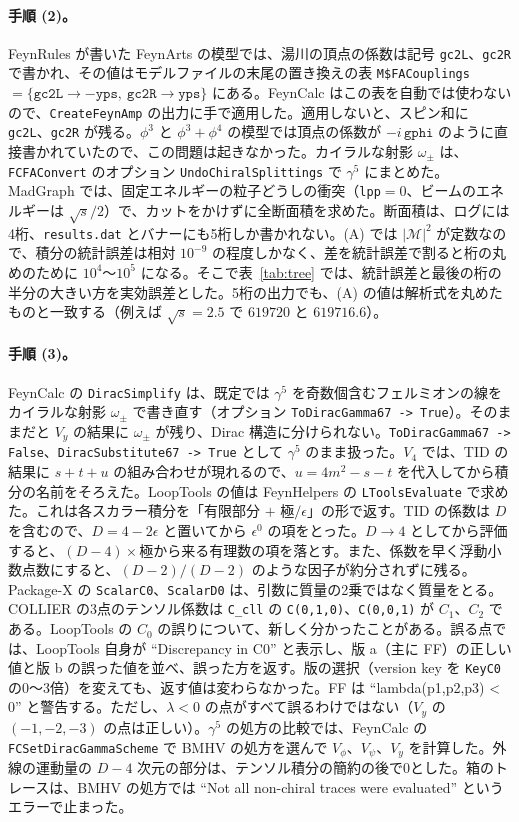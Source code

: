 \documentclass[a4paper,10pt]{ltjsarticle}
\begin{document}
\paragraph{手順 (2)。}FeynRules が書いた FeynArts の模型では、湯川の頂点の係数は記号 \texttt{gc2L}、\texttt{gc2R} で書かれ、その値はモデルファイルの末尾の置き換えの表 \texttt{M\$FACouplings} $=\{\texttt{gc2L}\to-\texttt{yps},\ \texttt{gc2R}\to\texttt{yps}\}$ にある。FeynCalc はこの表を自動では使わないので、\texttt{CreateFeynAmp} の出力に手で適用した。適用しないと、スピン和に \texttt{gc2L}、\texttt{gc2R} が残る。$\phi^3$ と $\phi^3+\phi^4$ の模型では頂点の係数が $-i\,\texttt{gphi}$ のように直接書かれていたので、この問題は起きなかった。カイラルな射影 $\omega_\pm$ は、\texttt{FCFAConvert} のオプション \texttt{UndoChiralSplittings} で $\gamma^5$ にまとめた。MadGraph では、固定エネルギーの粒子どうしの衝突（\texttt{lpp}$=0$、ビームのエネルギーは $\sqrt s/2$）で、カットをかけずに全断面積を求めた。断面積は、ログには4桁、\texttt{results.dat} とバナーにも5桁しか書かれない。(A) では $|\mathcal M|^2$ が定数なので、積分の統計誤差は相対 $10^{-9}$ の程度しかなく、差を統計誤差で割ると桁の丸めのために $10^4$〜$10^5$ になる。そこで表~\ref{tab:tree} では、統計誤差と最後の桁の半分の大きい方を実効誤差とした。5桁の出力でも、(A) の値は解析式を丸めたものと一致する（例えば $\sqrt s=2.5$ で $619720$ と $619716.6$）。

\paragraph{手順 (3)。}FeynCalc の \texttt{DiracSimplify} は、既定では $\gamma^5$ を奇数個含むフェルミオンの線をカイラルな射影 $\omega_\pm$ で書き直す（オプション \texttt{ToDiracGamma67 -> True}）。そのままだと $V_y$ の結果に $\omega_\pm$ が残り、Dirac 構造に分けられない。\texttt{ToDiracGamma67 -> False}、\texttt{DiracSubstitute67 -> True} として $\gamma^5$ のまま扱った。$V_4$ では、TID の結果に $s+t+u$ の組み合わせが現れるので、$u=4m^2-s-t$ を代入してから積分の名前をそろえた。LoopTools の値は FeynHelpers の \texttt{LToolsEvaluate} で求めた。これは各スカラー積分を「有限部分 $+$ 極$/\epsilon$」の形で返す。TID の係数は $D$ を含むので、$D=4-2\epsilon$ と置いてから $\epsilon^0$ の項をとった。$D\to4$ としてから評価すると、$(D-4)\times$極から来る有理数の項を落とす。また、係数を早く浮動小数点数にすると、$(D-2)/(D-2)$ のような因子が約分されずに残る。Package-X の \texttt{ScalarC0}、\texttt{ScalarD0} は、引数に質量の2乗ではなく質量をとる。COLLIER の3点のテンソル係数は \texttt{C\_cll} の \texttt{C(0,1,0)}、\texttt{C(0,0,1)} が $C_1$、$C_2$ である。LoopTools の $C_0$ の誤りについて、新しく分かったことがある。誤る点では、LoopTools 自身が ``Discrepancy in C0'' と表示し、版 a（主に FF）の正しい値と版 b の誤った値を並べ、誤った方を返す。版の選択（version key を \texttt{KeyC0} の0〜3倍）を変えても、返す値は変わらなかった。FF は ``lambda(p1,p2,p3) < 0'' と警告する。ただし、$\lambda<0$ の点がすべて誤るわけではない（$V_y$ の $(-1,-2,-3)$ の点は正しい）。$\gamma^5$ の処方の比較では、FeynCalc の \texttt{FCSetDiracGammaScheme} で BMHV の処方を選んで $V_\phi$、$V_\psi$、$V_y$ を計算した。外線の運動量の $D-4$ 次元の部分は、テンソル積分の簡約の後で0とした。箱のトレースは、BMHV の処方では ``Not all non-chiral traces were evaluated'' というエラーで止まった。
\end{document}
